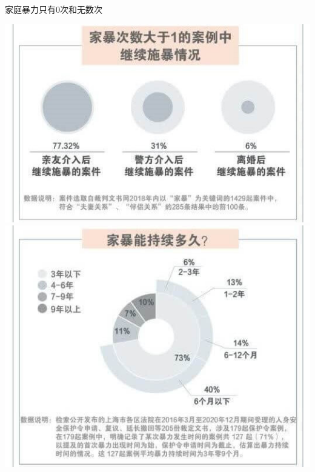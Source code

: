 \begin{frame}[t]{家庭暴力只有0次和无数次}
    \begin{block}{}
        \includegraphics[height=.5\textheight]{../docs/img/3-9.jpg}
        \hfill
        \includegraphics[height=.5\textheight]{../docs/img/3-10.jpg}
    \end{block}
\end{frame}

